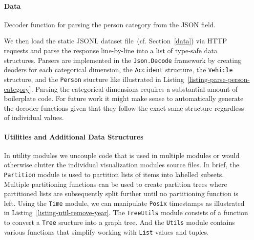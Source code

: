 \paragraph{Data}
\begin{listing}
    
    \caption{Decoder function for parsing the person category from the JSON field.}
    \label{listing-parse-person-category}
\end{listing}
We then load the static JSONL dataset file~(cf. Section~\ref{data}) via HTTP requests and parse the response line-by-line into a list of type-safe data structures. Parsers are implemented in the \lstinline{Json.Decode} framework by creating deoders for each categorical dimension, the \lstinline{Accident} structure, the \lstinline{Vehicle} structure, and the \lstinline{Person} stucture like illustrated in Listing~\ref{listing-parse-person-category}.
Parsing the categorical dimensions requires a substantial amount of boilerplate code. For future work it might make sense to automatically generate the decoder functions given that they follow the exact same structure regardless of individual values.

\paragraph{Utilities and Additional Data Structures}
\begin{listing}
    
    \caption{Type definitions for the \lstinline{Partition} module to partition lists based on named filters.}
    \label{listing-types-partition}
\end{listing}
\begin{listing}
    
    \caption{Helper function for stripping the year field represented in a \lstinline{Posix} timestamp.}
    \label{listing-util-remove-year}
\end{listing}
In utility modules we uncouple code that is used in multiple modules or would otherwise clutter the individual visualization modules source files.
In brief, the \lstinline{Partition} module is used to partition lists of items into labelled subsets. Multiple partitioning functions can be used to create partition trees where partitioned lists are subsequently split further until no partitioning function is left.
Using the \lstinline{Time} module, we can manipulate \lstinline{Posix} timestamps as illustrated in Listing~\ref{listing-util-remove-year}.
The \lstinline{TreeUtils} module consists of a function to convert a \lstinline{Tree} sructure into a graph tree.
And the \lstinline{Utils} module contains various functions that simplify working with \lstinline{List} values and tuples.

